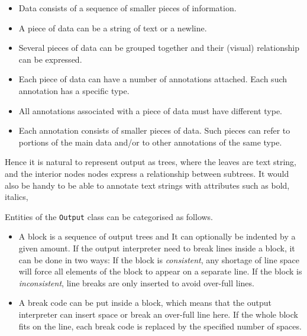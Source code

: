 \begin{docpart}
\begin{itemize}
\item Data consists of a sequence of smaller pieces of information.
\item A piece of data can be a string of text or a newline.
\item Several pieces of data can be grouped together and their
  (visual) relationship can be expressed.
\item Each piece of data can have a number of annotations attached.
  Each such annotation has a specific type.
\item All annotations associated with a piece of data must have
  different type.
\item Each annotation consists of smaller pieces of data. Such pieces
  can refer to portions of the main data and/or to other annotations
  of the same type.
\end{itemize}

Hence it is natural to represent output as trees, where the leaves
are text string, and the interior nodes nodes express a relationship
between subtrees. It would also be handy to be able to annotate text
strings with attributes such as bold, italics, \etc  

Entities of the \texttt{Output} class can be categorised as follows.

\begin{itemize}
\item A block is a sequence of output trees and It can optionally be
  indented by a given amount. If the output interpreter need to break
  lines inside a block, it can be done in two ways: If the block is
  \emph{consistent}, any shortage of line space will force all
  elements of the block to appear on a separate line. If the block is
  \emph{inconsistent}, line breaks are only inserted to avoid over-full
  lines.
\item A break code can be put inside a block, which means that the
  output interpreter can insert space or break an over-full line here.
  If the whole block fits on the line, each break code is replaced by
  the specified number of spaces.
  

\end{itemize}
\end{docpart}
